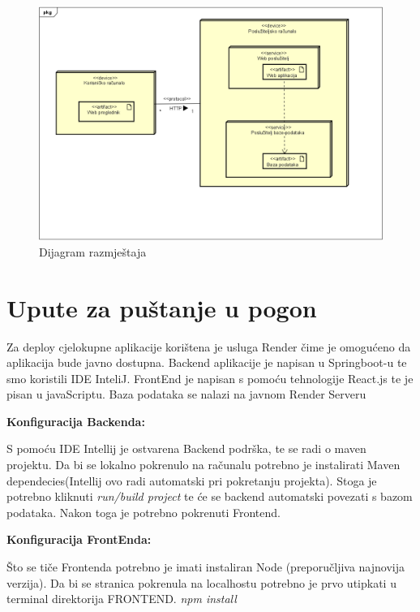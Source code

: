 			\begin{figure}[H]
				\includegraphics[width=\textwidth]{dijagrami/DijagramRazmjestaja.PNG} %
				\centering
				\caption{Dijagram razmještaja}
				\label{fig:diagrazmjestaja}
			\end{figure}
			
			
			\eject 
		
		\section{Upute za puštanje u pogon}
		
			
            Za deploy cjelokupne aplikacije 	korištena je usluga Render čime je omogućeno da aplikacija bude javno dostupna. Backend aplikacije je napisan u Springboot-u te smo koristili IDE InteliJ.  FrontEnd je napisan s pomoću tehnologije React.js te je pisan u javaScriptu. Baza podataka se nalazi na javnom Render Serveru

            \textbf{Konfiguracija Backenda:}
            
            S pomoću IDE Intellij je ostvarena Backend podrška, te se radi o maven projektu.
            Da bi se lokalno pokrenulo na računalu potrebno je instalirati Maven dependecies(Intellij ovo radi automatski pri pokretanju projekta).
            Stoga je potrebno kliknuti \textit{run/build project} te će se backend automatski povezati s bazom podataka.
            Nakon toga je potrebno pokrenuti Frontend.

            \textbf{Konfiguracija FrontEnda:}
            
            Što se tiče Frontenda potrebno je imati instaliran Node (preporučljiva najnovija verzija). 
            Da bi se stranica pokrenula na localhostu potrebno je prvo utipkati u terminal direktorija FRONTEND. 
                \textit{npm install}
         
